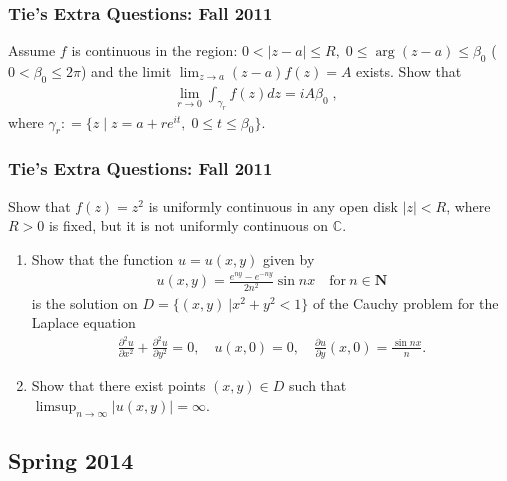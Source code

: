 \hypertarget{ties-extra-questions-fall-2011-11}{%
\subsubsection{Tie's Extra Questions: Fall
2011}\label{ties-extra-questions-fall-2011-11}}

Assume \(f\) is continuous in the region:
\(0< |z-a| \leq R, \; 0 \leq \arg(z-a) \leq \beta_0\)
(\(0 < \beta_0 \leq 2 \pi\)) and the limit
\(\displaystyle \lim_{z \rightarrow a} (z-a) f(z) = A\) exists. Show
that
\begin{align*}\lim_{r \rightarrow 0} \int_{\gamma_r} f(z) dz  = i A \beta_0 \; , \; \;\end{align*}
where
\(\gamma_r : = \{ z \; | \; z = a + r e^{it}, \; 0 \leq t \leq \beta_0 \}.\)

\hypertarget{ties-extra-questions-fall-2011-12}{%
\subsubsection{Tie's Extra Questions: Fall
2011}\label{ties-extra-questions-fall-2011-12}}

Show that \(f(z) = z^2\) is uniformly continuous in any open disk
\(|z| < R\), where \(R>0\) is fixed, but it is not uniformly continuous
on \(\mathbb C\).

\begin{enumerate}
\def\labelenumi{(\arabic{enumi})}
\tightlist
\item
  Show that the function \(u=u(x,y)\) given by
  \begin{align*}u(x,y)=\frac{e^{ny}-e^{-ny}}{2n^2}\sin nx\quad \text{for}\ n\in {\mathbf N}\end{align*}
  is the solution on \(D=\{(x,y)\ | x^2+y^2<1\}\) of the Cauchy problem
  for the Laplace equation
  \begin{align*}\frac{\partial ^2u}{\partial x^2}+\frac{\partial ^2u}{\partial y^2}=0,\quad
  u(x,0)=0,\quad \frac{\partial u}{\partial y}(x,0)=\frac{\sin nx}{n}.\end{align*}
\item
  Show that there exist points \((x,y)\in D\) such that
  \(\displaystyle{\limsup_{n\to\infty} |u(x,y)|=\infty}\).
\end{enumerate}

\hypertarget{spring-2014}{%
\subsection{Spring 2014}\label{spring-2014}}


